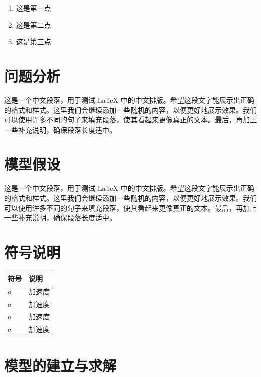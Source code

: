 \documentclass{cumcmthesis} %
\begin{document}
\begin{enumerate}[1.]\setlength{\itemsep}{0pt}
    \item 这是第一点
    \item 这是第二点
    \item 这是第三点
\end{enumerate}

\section{问题分析}

这是一个中文段落，用于测试 LaTeX 中的中文排版。希望这段文字能展示出正确的格式和样式。这里我们会继续添加一些随机的内容，以便更好地展示效果。我们可以使用许多不同的句子来填充段落，使其看起来更像真正的文本。最后，再加上一些补充说明，确保段落长度适中。

\section{模型假设}

这是一个中文段落，用于测试 LaTeX 中的中文排版。希望这段文字能展示出正确的格式和样式。这里我们会继续添加一些随机的内容，以便更好地展示效果。我们可以使用许多不同的句子来填充段落，使其看起来更像真正的文本。最后，再加上一些补充说明，确保段落长度适中。

\section{符号说明}

\setcounter{table}{-1} %

\begin{center}%
    \begin{longtable}{p{3.5cm}<{\centering}p{10cm}<{\centering}}
        \toprule[1.5pt]
        符号  & 说明   \\ %
        \midrule
        $ a $ & 加速度 \\
        $ a $ & 加速度 \\
        $ a $ & 加速度 \\
        $ a $ & 加速度 \\
        \bottomrule[1.5pt]
    \end{longtable}
\end{center}


\section{模型的建立与求解}
\end{document}

